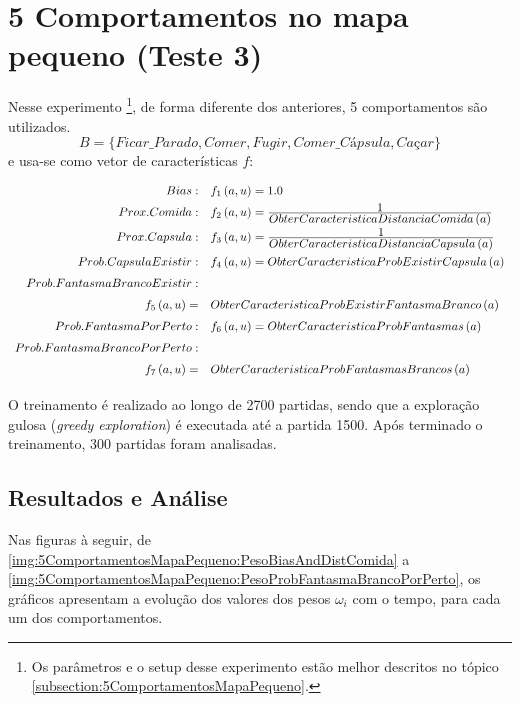 \section{5 Comportamentos no mapa pequeno (Teste 3)}

Nesse experimento%
\footnote{Os parâmetros e o setup desse experimento estão melhor descritos no tópico \ref{subsection:5ComportamentosMapaPequeno}.%
}, de forma diferente dos anteriores, 5 comportamentos são utilizados. 
$$ B = \{Ficar\_Parado, Comer, Fugir, \textit{Comer\_Cápsula}, \textit{Caçar} \} $$
e usa-se como vetor de características $ f $:
\begin{equation}
	\renewcommand\arraystretch{1.5}
	\begin{array}{r l}
		Bias: & f_1 \left( a, u \right) = 1.0 \\
		Prox. Comida: & f_2 \left( a, u \right) = \frac{\displaystyle 1}{\displaystyle ObterCaracteristicaDistanciaComida \left( a \right)} \\
		Prox. Capsula: & f_3 \left( a, u \right) = \frac{\displaystyle 1}{\displaystyle ObterCaracteristicaDistanciaCapsula \left( a \right)} \\
		Prob. Capsula Existir: & f_4 \left( a, u \right) = ObterCaracteristicaProbExistirCapsula \left( a \right) \\
		Prob. Fantasma Branco Existir: & \\ 
		f_5 \left( a, u \right) = & ObterCaracteristicaProbExistirFantasmaBranco \left( a \right) \\
		Prob. Fantasma Por Perto: & f_6 \left( a, u \right) = ObterCaracteristicaProbFantasmas \left( a \right) \\
		Prob. Fantasma Branco Por Perto: & \\
		f_7 \left( a, u \right) = & ObterCaracteristicaProbFantasmasBrancos \left( a \right)
	\end{array}
\end{equation}

O treinamento é realizado ao longo de 2700 partidas, sendo que a exploração gulosa (\textit{greedy exploration}) é executada até a partida 1500. Após terminado o treinamento, 300 partidas foram analisadas.


\subsection{Resultados e Análise}

Nas figuras à seguir, de \ref{img:5ComportamentosMapaPequeno:PesoBiasAndDistComida} a \ref{img:5ComportamentosMapaPequeno:PesoProbFantasmaBrancoPorPerto}, os gráficos apresentam a evolução dos valores dos pesos $ \omega_i $ com o tempo, para cada um dos comportamentos.

